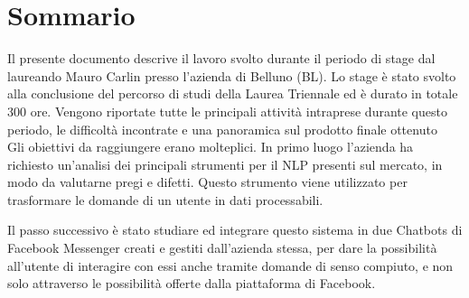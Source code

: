 
\cleardoublepage
{}
{}
\begingroup
\let\clearpage\relax
\let\cleardoublepage\relax
\let\cleardoublepage\relax

\chapter*{Sommario}

Il presente documento descrive il lavoro svolto durante il periodo di stage dal laureando Mauro Carlin presso l'azienda \azienda{} di Belluno (BL). Lo stage è stato svolto alla conclusione del percorso di studi della Laurea Triennale ed è durato in totale 300 ore. Vengono riportate tutte le principali attività intraprese durante questo periodo, le difficoltà incontrate e una panoramica sul prodotto finale ottenuto\\
Gli obiettivi da raggiungere erano molteplici. In primo luogo l'azienda ha richiesto un'analisi dei principali strumenti per il \gls{NLP} presenti sul mercato, in modo da valutarne pregi e difetti. Questo strumento viene utilizzato per trasformare le domande di un utente in dati processabili.


Il passo successivo è stato studiare ed integrare questo sistema in due \glspl{Chatbot} di Facebook Messenger creati e gestiti dall'azienda stessa, per dare la possibilità all'utente di interagire con essi anche tramite domande di senso compiuto, e non solo attraverso le possibilità offerte dalla piattaforma di Facebook.\\

%
%

\endgroup			

\vfill